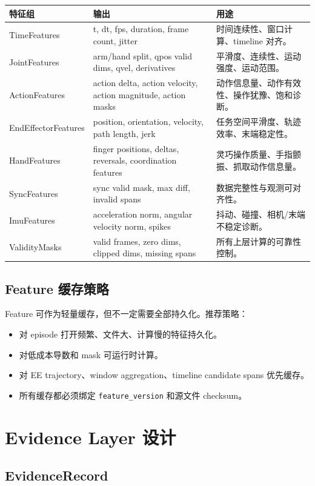 \documentclass[UTF8,zihao=-4]{ctexart}
\newcommand{\Code}[1]{\texttt{#1}}
\begin{document}
\begin{longtable}{L{3.5cm} L{4.5cm} L{6cm}}
\toprule
特征组 & 输出 & 用途 \\
\midrule
TimeFeatures & t, dt, fps, duration, frame count, jitter & 时间连续性、窗口计算、timeline 对齐。 \\
JointFeatures & arm/hand split, qpos valid dims, qvel, derivatives & 平滑度、连续性、运动强度、运动范围。 \\
ActionFeatures & action delta, action velocity, action magnitude, action masks & 动作信息量、动作有效性、操作犹豫、饱和诊断。 \\
EndEffectorFeatures & position, orientation, velocity, path length, jerk & 任务空间平滑度、轨迹效率、末端稳定性。 \\
HandFeatures & finger positions, deltas, reversals, coordination features & 灵巧操作质量、手指颤振、抓取动作信息量。 \\
SyncFeatures & sync valid mask, max diff, invalid spans & 数据完整性与观测可对齐性。 \\
ImuFeatures & acceleration norm, angular velocity norm, spikes & 抖动、碰撞、相机/末端不稳定诊断。 \\
ValidityMasks & valid frames, zero dims, clipped dims, missing spans & 所有上层计算的可靠性控制。 \\
\bottomrule
\end{longtable}

\subsection{Feature 缓存策略}

Feature 可作为轻量缓存，但不一定需要全部持久化。推荐策略：

\begin{itemize}
\item 对 episode 打开频繁、文件大、计算慢的特征持久化。
\item 对低成本导数和 mask 可运行时计算。
\item 对 EE trajectory、window aggregation、timeline candidate spans 优先缓存。
\item 所有缓存都必须绑定 \Code{feature\_version} 和源文件 checksum。
\end{itemize}

\section{Evidence Layer 设计}

\subsection{EvidenceRecord}
\end{document}
